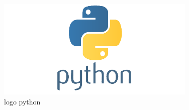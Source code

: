     \begin{figure}[H]
    	\centering
    	\includegraphics[scale=0.5]{gambar/py}
    	\caption{logo python}
    	\label{py}
    \end{figure}

